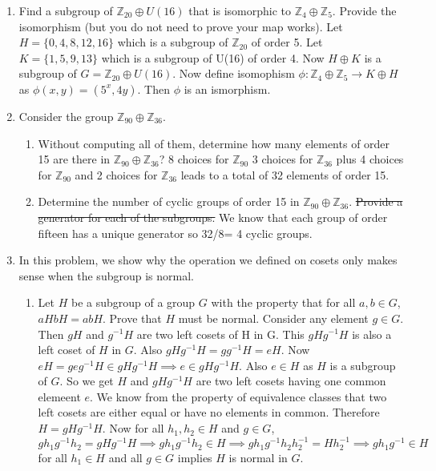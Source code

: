 \documentclass{article}
\newcommand{\ZZ}{\mathbb{Z}}
\begin{document}


\begin{enumerate}

\item Find a subgroup of $\ZZ_{20} \oplus U(16)$ that is isomorphic to $\ZZ_4\oplus\ZZ_5$. Provide the isomorphism (but you do not need to prove your map works). Let $H = \{0,4,8,12,16\}$ which is a subgroup of $\ZZ_{20}$ of order 5. Let $K = \{1,5,9,13\}$ which is a subgroup of U(16) of order 4. Now $H \oplus K$ is a subgroup of $G= \ZZ_{20} \oplus U(16)$. Now define isomophism $\phi : \ZZ_{4} \oplus \ZZ_{5} \rightarrow K \oplus H$ as $\phi (x,y) = (5^{x},4y)$. Then $\phi$ is an ismorphism.

    
\item Consider the group $\ZZ_{90}\oplus\ZZ_{36}$.
    \begin{enumerate}
        \item Without computing all of them, determine how many elements of order 15 are there in $\ZZ_{90}\oplus\ZZ_{36}$? 8 choices for $\ZZ_{90}$ 3 choices for $\ZZ_{36}$ plus 4 choices for $\ZZ_{90}$ and 2 choices for $\ZZ_{36}$ leads to a total of 32 elements of order 15. 
        
        
        \item Determine the number of cyclic groups of order 15 in $\ZZ_{90}\oplus\ZZ_{36}$. {\color{red}\st{Provide a generator for each of the subgroups.}} We know that each group of order fifteen has a unique generator so 32/8= 4 cyclic groups.

    \end{enumerate}
    
    
\item In this problem, we show why the operation we defined on cosets only makes sense when the subgroup is normal. 
    \begin{enumerate} 
        \item Let $H$ be a subgroup of a group $G$ with the property that for all $a,b\in G$, $aHbH=abH$. Prove that $H$ must be normal. Consider any element $g \in G$. Then $gH$ and $g^{-1} H$ are two left cosets of H in G. This $gHg^{-1}H$ is also a left coset of $H$ in $G$. Also  $gHg^{-1}H = g g^{-1} H = e H$. Now $eH = geg^{-1} H \in gHg^{-1}H \implies e \in gHg^{-1}H$. Also $e \in H$ as $H$ is a subgroup of $G$. So we get $H$ and $gHg^{-1}H$ are two left cosets having one common elemeent $e$. We know from the property of equivalence classes that two left cosets are either equal or have no elements in common. Therefore $H = gHg^{-1}H$. Now for all $h_1, h_2 \in H$ and $g \in G$, $gh_1g^{-1}h_2 = gHg^{-1}H \implies gh_1g^{-1}h_2 \in H \implies gh_1g^{-1}h_2h^{-1}_{2} = Hh_{2}^{-1} \implies gh_1g^{-1} \in H$ for all $h_1 \in H$ and all $g \in G$ implies $H$ is normal in $G$. 
        

\end{enumerate}
\end{enumerate}
\end{document}
